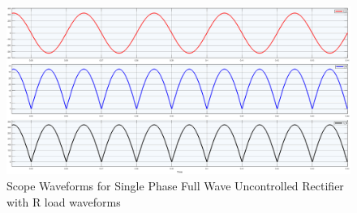 \begin{figure}[h]
    \centering
    \includegraphics[width=1\textwidth]{images/experiment-2/circuit-scope-simulation-01.png}
    \caption{Scope Waveforms for Single Phase Full Wave Uncontrolled Rectifier with R load waveforms}
    \label{Fig_waveform_single-phase-full-wave-uncontrolled-rectifier-with-R-load}
\end{figure}

\pagebreak